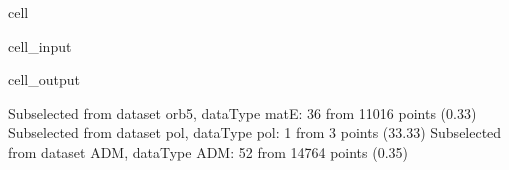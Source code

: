 \documentclass[letterpaper,table,10pt,english]{jupyterBook}
\begin{document}
\begin{sphinxuseclass}{cell}
\begin{sphinxVerbatimInput}
\begin{sphinxuseclass}{cell_input}
\begin{sphinxVerbatim}[commandchars=\\\{\}]
\PYG{p}{[}\PYG{p}{]}     
        \PYG{p}{[}  \PYG{p}{]} 
\end{sphinxVerbatim}

\end{sphinxuseclass}\end{sphinxVerbatimInput}
\begin{sphinxVerbatimOutput}

\begin{sphinxuseclass}{cell_output}
\begin{sphinxVerbatim}[commandchars=\\\{\}]
Subselected from dataset \PYGZsq{}orb5\PYGZsq{}, dataType \PYGZsq{}matE\PYGZsq{}: 36 from 11016 points (0.33\PYGZpc{})
Subselected from dataset \PYGZsq{}pol\PYGZsq{}, dataType \PYGZsq{}pol\PYGZsq{}: 1 from 3 points (33.33\PYGZpc{})
Subselected from dataset \PYGZsq{}ADM\PYGZsq{}, dataType \PYGZsq{}ADM\PYGZsq{}: 52 from 14764 points (0.35\PYGZpc{})
\end{sphinxVerbatim}

\end{sphinxuseclass}\end{sphinxVerbatimOutput}

\end{sphinxuseclass}
\end{document}
